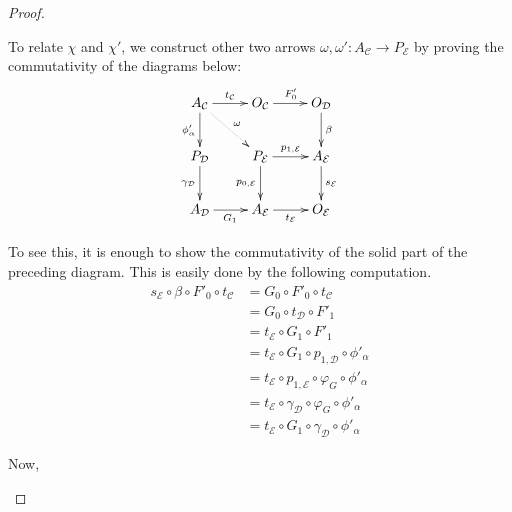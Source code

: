 \documentclass[a4paper,UKenglish,cleveref,pdftex,thm-restate,numberwithinsect]{lipics-v2021}
\begin{document}
\begin{proof}
\begin{enumerate}
			
To relate $\chi$ and $\chi'$, we construct other two arrows $\omega, \omega' \colon A_{\mathcal{C}}\to P_{\mathcal{E}}$ by proving the commutativity of the diagrams below: 
\[\xymatrix{ A_{\mathcal{C}} \ar@{.>}[dr]^{\omega}\ar[d]_{\phi'_\alpha} \ar[r]^{t_{\mathcal{C}}}& O_{\mathcal{C}} \ar[r]^{F'_0}& O_{\mathcal{D}} \ar[d]^{\beta}\\ P_{\mathcal{D}} \ar[d]_{\gamma_\mathcal{D}} & P_{\mathcal{E}}  \ar[r]^{p_{1, \mathcal{E}}} \ar[d]_{p_{0, \mathcal{E}}}& A_{\mathcal{E}} \ar[d]^{s_{\mathcal{E}}}\\ A_{\mathcal{D}} \ar[r]_{G_1} & A_{\mathcal{E}} \ar[r]_{t_{\mathcal{E}}} & O_{\mathcal{E}}}\]

To see this, it is enough to show the commutativity of the solid part of the preceding diagram. This is easily done by the following computation. 
\begin{align*}
	s_{\mathcal{E}}\circ \beta \circ F'_0 \circ t_{\mathcal{C}}&= G_0\circ F'_0\circ t_{\mathcal{C}}\\ & = G_0\circ t_{\mathcal{D}}\circ F'_1\\&= t_{\mathcal{E}}\circ G_1\circ F'_1
	\\&=t_{\mathcal{E}}\circ G_1\circ p_{1, \mathcal{D}} \circ \phi'_{\alpha}	 \\&= t_{\mathcal{E}}\circ p_{1, \mathcal{E}} \circ \varphi_{G} \circ \phi'_\alpha\\ &= t_{\mathcal{E}}\circ \gamma_{\mathcal{D}} \circ \varphi_{G}\circ \phi'_{\alpha}\\&=t_{\mathcal{E}}\circ G_1\circ \gamma_{\mathcal{D}}\circ \phi'_{\alpha}	\end{align*}

Now,



\end{enumerate}
\end{proof}
\end{document}
